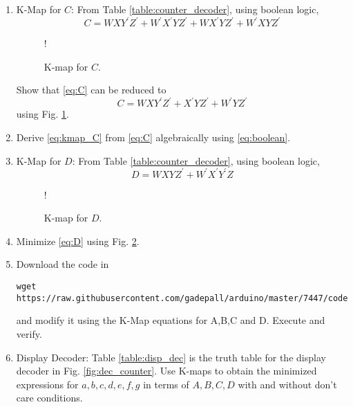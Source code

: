 \documentclass[journal,12pt,twocolumn]{IEEEtran}
\begin{document}
\begin{enumerate}[1.]
%
%
\item {K-Map for $C$: }
From Table \ref{table:counter_decoder}, using boolean logic,
\begin{equation}
\label{eq:C}
C = WXY^{\prime}Z^{\prime} + W^{\prime}X^{\prime}YZ^{\prime}
+WX^{\prime}YZ^{\prime}
+W^{\prime}XYZ^{\prime}
\end{equation}
%
%
\begin{figure}[!h]
\resizebox {\columnwidth} {!} {

}
\caption{K-map for $C$.}
\label{fig:kmap_C}
\end{figure}
%
Show that \eqref{eq:C} can be reduced to
\begin{equation}
\label{eq:kmap_C}
C = WXY^{\prime}Z^{\prime}  +  X^{\prime}YZ^{\prime} + W^{\prime}YZ^{\prime}
\end{equation}
using Fig. \ref{fig:kmap_C}.
%
\item 
Derive \eqref{eq:kmap_C} from \eqref{eq:C} algebraically using \eqref{eq:boolean}.
%
\item {K-Map for $D$: }
From Table \ref{table:counter_decoder}, using boolean logic,
\begin{equation}
\label{eq:D}
D = WXYZ^{\prime} + W^{\prime}X^{\prime}Y^{\prime}Z
\end{equation}
%
\begin{figure}[!h]
\resizebox {\columnwidth} {!} {

}
\caption{K-map for $D$.}
\label{fig:kmap_D}
\end{figure}
%
\item 
Minimize \eqref{eq:D} using Fig. \ref{fig:kmap_D}.
%
\item Download the code in
\begin{lstlisting}
wget https://raw.githubusercontent.com/gadepall/arduino/master/7447/codes/inc_dec/inc_dec.ino
\end{lstlisting}
%
and modify it using the K-Map equations for A,B,C and D. Execute and verify.
\item {Display Decoder:}
Table \ref{table:disp_dec} is the truth table for the display decoder in Fig. \ref{fig:dec_counter}.  
Use K-maps to obtain the minimized expressions for $a,b,c,d,e,f,g$ in terms of $A,B,C,D$ with and without don't care conditions.
%

\end{enumerate}
\end{document}

